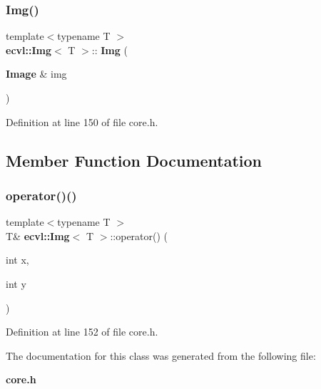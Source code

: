 \subsubsection{Img()}
{\footnotesize\ttfamily template$<$typename T $>$ \\
\textbf{ ecvl\+::\+Img}$<$ T $>$\+::\textbf{ Img} (\begin{DoxyParamCaption}\item[{\textbf{ Image} \&}]{img }\end{DoxyParamCaption})\hspace{0.3cm}{\ttfamily [inline]}}



Definition at line 150 of file core.\+h.



\subsection{Member Function Documentation}
\mbox{\label{classecvl_1_1_img_a7381b98851a54ef336f4498ebca0aff5}} 
\subsubsection{operator()()}
{\footnotesize\ttfamily template$<$typename T $>$ \\
T\& \textbf{ ecvl\+::\+Img}$<$ T $>$\+::operator() (\begin{DoxyParamCaption}\item[{int}]{x,  }\item[{int}]{y }\end{DoxyParamCaption})\hspace{0.3cm}{\ttfamily [inline]}}



Definition at line 152 of file core.\+h.



The documentation for this class was generated from the following file\+:\begin{DoxyCompactItemize}
\item 
\textbf{ core.\+h}\end{DoxyCompactItemize}
